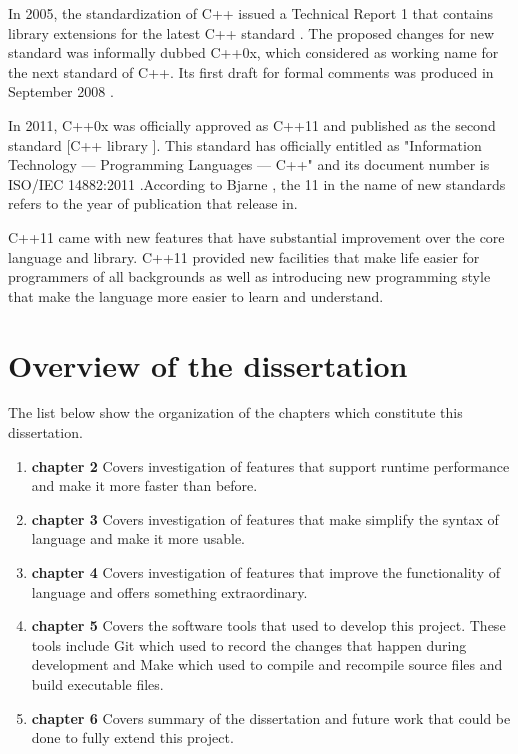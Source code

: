 \documentclass[11pt]{report}
\begin{document}
In 2005, the standardization of C++ issued a Technical Report 1 that contains library extensions for the latest C++ standard \cite{Josuttis:2012:CppStandardLibrary}. The proposed changes for new standard was informally dubbed C++0x, which considered as working name for the next standard of C++. Its first draft for formal comments was produced in September 2008 \cite{CplusplusHistoryofCpp}. 

In 2011, C++0x was officially approved as C++11 and published as the second standard [C++ library ]. This standard has officially entitled as "Information Technology — Programming Languages — C++" and its document number is ISO/IEC 14882:2011 \cite{Josuttis:2012:CppStandardLibrary}.According to Bjarne \cite{Stroustrup:2012:Cpp11}, the 11 in the name of new standards refers to the year of publication that release in.

C++11 came with new features that have substantial improvement over the core language and library. C++11 provided new facilities that make life easier for programmers of all backgrounds as well as introducing new programming style  that make the language more easier to learn and understand.


\section{Overview of the dissertation}
\label{sec:Overview}
The list below show the organization of the chapters which constitute this dissertation.

\begin{enumerate}

\item \textbf{chapter 2} Covers investigation of features that support runtime performance and make it more faster than before.

\item \textbf{chapter 3} Covers investigation of features that make simplify the syntax of language and make it more usable.

\item \textbf{chapter 4} Covers investigation of features that improve the functionality of language and offers something extraordinary.

\item \textbf{chapter 5} Covers the software tools that used to develop this project. These tools include Git which used to record the changes that happen during development and Make which used to compile and recompile source files and build executable files.

\item \textbf{chapter 6} Covers summary of the dissertation and future work that could be done to fully extend this project.

\end{enumerate}
\end{document}
